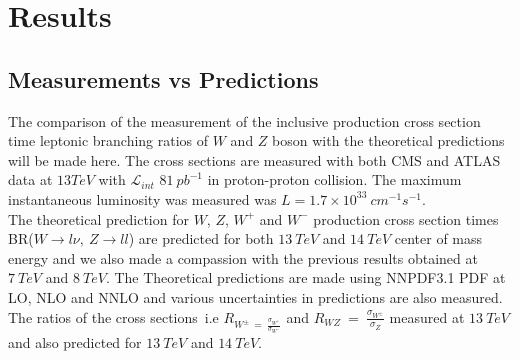 \documentclass[a4paper,12pt]{report}
\numberwithin{equation}{section}
\begin{document}
\section{Results}
\subsection{Measurements vs Predictions}
The comparison of the measurement of the inclusive production cross section time leptonic branching ratios of $W$ and $Z$ boson with the theoretical predictions will be made here. The cross sections are measured with both CMS and ATLAS data at $13TeV$ with $\mathcal{L}_{int}$ $81~pb^{-1}$ in proton-proton collision. The maximum instantaneous luminosity was measured was $L = 1.7\times10^{33}~cm^{-1}s^{-1}$.\\
The theoretical prediction for $W$, $Z$, $W^{+}$ and $W^{-}$ production cross section times BR($W\rightarrow l\nu,~Z\rightarrow ll$) are predicted for both $13~TeV$ and $14~TeV$ center of mass energy and we also made a compassion with the previous results obtained at $7~TeV$ and $8~TeV$. The Theoretical predictions are made using NNPDF3.1 PDF at LO, NLO and NNLO and various uncertainties in predictions are also measured.\\
The ratios of the cross sections~i.e $R_{W^{\pm}~=~\frac{\sigma_{W^{+}}}{\sigma_{W^{-}}}}$ and $R_{WZ}~=~\frac{\sigma_{W^{\pm}}}{\sigma_{Z}}$ measured at $13~TeV$ and also predicted for $13~TeV$ and $14~TeV$.\\
\end{document}
